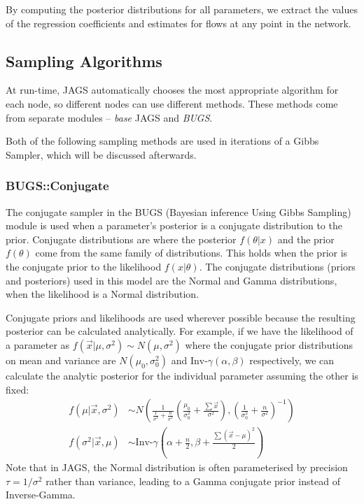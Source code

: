 \documentclass[a4paper, 12pt]{article}
\begin{document}
By computing the posterior distributions for all parameters, we extract the values of the regression coefficients and estimates for flows at any point in the network.

\subsection{Sampling Algorithms}
At run-time, JAGS automatically chooses the most appropriate algorithm for each node, so different nodes can use different methods. These methods come from separate modules -- \emph{base} JAGS and \emph{BUGS}.

Both of the following sampling methods are used in iterations of a Gibbs Sampler, which will be discussed afterwards.

\subsubsection{BUGS::Conjugate}
The conjugate sampler in the BUGS (Bayesian inference Using Gibbs Sampling) module is used when a parameter's posterior is a conjugate distribution to the prior. Conjugate distributions are where the posterior $f(\theta|x)$ and the prior $f(\theta)$ come from the same family of distributions. This holds when the prior is the conjugate prior to the likelihood $f(x|\theta)$. The conjugate distributions (priors and posteriors) used in this model are the Normal and Gamma distributions, when the likelihood is a Normal distribution.

Conjugate priors and likelihoods are used wherever possible because the resulting posterior can be calculated analytically. For example, if we have the likelihood of a parameter as $f(\vec{x}|\mu,\sigma^2)\sim N(\mu,\sigma^2)$ where the conjugate prior distributions on mean and variance are $N(\mu_0,\sigma^2_0)$ and $\text{Inv-}\gamma(\alpha,\beta)$ respectively, we can calculate the analytic posterior for the individual parameter assuming the other is fixed:
\begin{align}
f(\mu|\vec{x},\sigma^2) &\sim N\left( \frac{1}{\frac{1}{\sigma^2} + \frac{n}{\sigma^2}} \left( \frac{\mu_0}{\sigma^2_0} + \frac{\sum\vec{x}}{\sigma^2} \right) , \left( \frac{1}{\sigma^2_0} + \frac{n}{\sigma^2} \right)^{-1} \right)\\
f(\sigma^2|\vec{x},\mu) &\sim \text{Inv-}\gamma \left( \alpha+\frac{n}{2} , \beta+\frac{\sum(\vec{x}-\mu)^2}{2} \right)
\end{align}
Note that in JAGS, the Normal distribution is often parameterised by precision $\tau = 1/\sigma^2$ rather than variance, leading to a Gamma conjugate prior instead of Inverse-Gamma.
\end{document}
